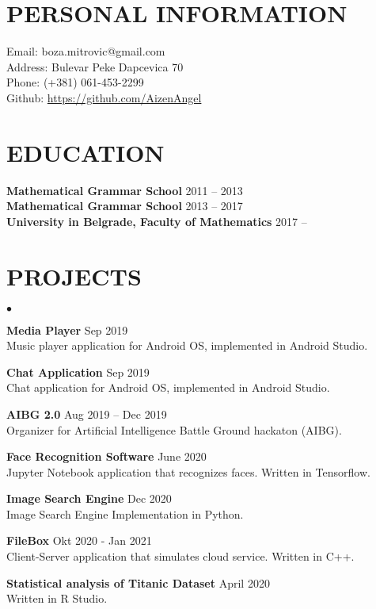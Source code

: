 \documentclass[margin,line]{res}
\newenvironment{list2}{
  \begin{list}{$\bullet$}{%
      \setlength{\itemsep}{0in}
      \setlength{\parsep}{0in} \setlength{\parskip}{0in}
      \setlength{\topsep}{0in} \setlength{\partopsep}{0in}
      \setlength{\leftmargin}{0.2in}}}{\end{list}}
\begin{document}


\begin{resume}
\section{PERSONAL INFORMATION}
{ Email:    }   boza.mitrovic@gmail.com  \\ 
{ Address:} Bulevar Peke Dapcevica 70   \\  
{ Phone: }(+381) 061-453-2299  \\ 
{ Github: } \url{https://github.com/AizenAngel}


\section{EDUCATION}
{\bf Mathematical Grammar School} \hfill 2011 -- 2013\\
{\bf Mathematical Grammar School} \hfill 2013 -- 2017\\
{\bf University in Belgrade, Faculty of Mathematics}  \hfill 2017 -- 


\section{PROJECTS\\}
\begin{list2}
  \item{\bf Media Player} \hfill  Sep 2019\\
    Music player application for Android OS, implemented in Android Studio.
  \item{\bf Chat Application} \hfill Sep 2019\\
    Chat application for Android OS, implemented in Android Studio.
  \item{\bf AIBG 2.0} \hfill Aug 2019 -- Dec 2019 \\ 
    Organizer for Artificial Intelligence Battle Ground hackaton (AIBG).
  \item{\bf Face Recognition Software} \hfill June 2020\\
    Jupyter Notebook application that recognizes faces. Written in Tensorflow.
  \item{\bf Image Search Engine} \hfill Dec 2020 \\
    Image Search Engine Implementation in Python.
  \item{\bf FileBox}  \hfill Okt 2020 - Jan 2021\\
    Client-Server application that simulates cloud service. Written in C++.
  \item{\bf Statistical analysis of Titanic Dataset} \hfill April 2020\\
    Written in R Studio.


\end{list2}
\end{resume}
\end{document}
